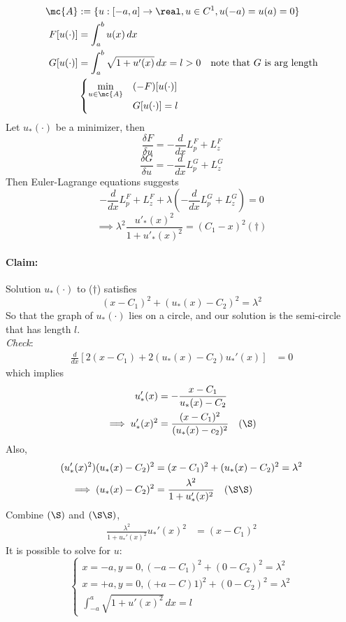 \documentclass[11pt]{article}
\begin{document}
	\example
	\begin{align}
		\mc{A} &:= \{u: [-a, a] \rightarrow \real, u \in C^1, u(-a) = u(a) = 0 \}\\
		F[u(\cdot)] &= \int_a^b u(x) \, dx \\
		G[u(\cdot)] &= \int_a^b \sqrt{1 + u'(x)} \, dx = l > 0 \quad\text{note that $G$ is arg length}\\
		&\begin{cases}
			\underset{u \in \mc{A}}{\min} &(-F)[u(\cdot)] \\
			&G[u(\cdot)] = l
		\end{cases}
	\end{align}
	Let $u_*(\cdot)$ be a minimizer, then
	$$\frac{\delta F}{\delta u} = - \frac{d}{dx}L_p^F + L_z^F$$
	$$\frac{\delta G}{\delta u} = - \frac{d}{dx}L_p^G + L_z^G$$
	Then Euler-Lagrange equations suggests
	$$- \frac{d}{dx}L_p^F + L_z^F + \lambda(- \frac{d}{dx}L_p^G + L_z^G) = 0$$
	$$\implies \lambda^2 \frac{u'_*(x)^2}{1 + u'_*(x)^2} = (C_1 - x)^2 (\dagger)$$
	\paragraph{Claim:} Solution $u_*(\cdot)$ to ($\dagger$) satisfies
	$$(x-C_1)^2 + (u_*(x) - C_2)^2 = \lambda^2$$
	So that the graph of $u_*(\cdot)$ lies on a circle, and our solution is the semi-circle that has length $l$.\\
	\emph{Check}: 
		\begin{align}
			\frac{d}{dx} \left[ 2(x - C_1) + 2(u_*(x) - C_2)u_*'(x) \right] &= 0
		\end{align}
		which implies
		\begin{align}
			u'_*(x) &= - \frac{x - C_1}{u_*(x) - C_2} \\
			\implies u'_*(x)^2 &= \frac{(x - C_1)^2}{(u_*(x) - c_2)^2}\quad (\S)
		\end{align}
		Also, 
		\begin{align}
			(u_*'(x)^2)(u_*(x) - C_2)^2  &= (x - C_1)^2 + (u_*(x) - C_2)^2 = \lambda^2 \\
			\implies (u_*(x) - C_2)^2 &= \frac{\lambda^2}{1 + u'_*(x)^2}\quad (\S \S)
		\end{align}
		Combine $(\S)$ and $(\S \S)$,
		\begin{align}
			\frac{\lambda^2}{1 + u_*'(x)^2} u_*'(x)^2 &= (x - C_1)^2
		\end{align}
	It is possible to solve for $u$:
	$$\begin{cases}
		x=-a, y=0, (-a-C_1)^2 + (0-C_2)^2 = \lambda^2 \\
		x=+a, y=0, (+a-C)1)^2 + (0-C_2)^2 = \lambda^2 \\
		\int_{-a}^a \sqrt{1 + u'(x)^2} \, dx = l
	\end{cases}$$
\end{document}
